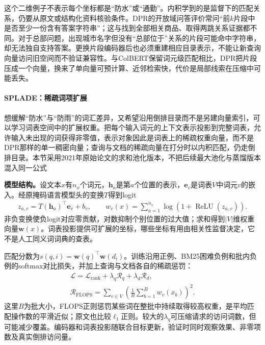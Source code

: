 这个二维例子不表示每个坐标都是“防水”或“通勤”。内积学到的是监督下的匹配关系，仍要从原文或结构化资料核验条件。DPR的开放域问答评价常问“前$k$片段中是否至少一份含有答案字符串”；这与找到全部相关商品、取得两跳关系证据都不同。对于总部问题，出现城市名字但没有“总部位于”关系的片段可能命中字符串，却无法独自支持答案。更换片段编码器后也必须重建相应目录表示，不能让新查询向量访问旧空间而不验证兼容性。与ColBERT保留词元级匹配相比，DPR把片段压成一个向量，换来了单向量可预计算、近邻检索快，代价是局部线索在压缩中可能丢失。

\Needspace{100mm}
\paragraph{SPLADE：稀疏词项扩展}
\label{sec:rs-search-splade}

想缓解“防水”与“防雨”的词汇差异，又希望沿用倒排目录而不是另建向量索引，可以学习词表空间中的扩展权重。把每个输入词元的上下文表示投影到完整词表，允许输入未出现的词获得非零值，表示对象因此是词表上的稀疏权重向量，而不是DPR那样的单一稠密向量；查询与文档的稀疏向量在打分时以内积匹配，仍走倒排目录。本节采用2021年原始论文的求和池化版本，不把后续最大池化与蒸馏版本混入同一公式

\textbf{模型结构。}设文本$x$有$n_x$个词元，$\bm h_a$是第$a$个位置的表示，$\bm e_v$是词表$V$中词元$v$的嵌入。经原掩码语言模型头的变换$T$得到logit
\begin{equation}
 \begin{split}
 z_{a,v}=T(\bm h_a)^\top\bm e_v+b_v,\qquad
 w_v(x)=\sum_{a=1}^{n_x}\log(1+\operatorname{ReLU}(z_{a,v})).
 \end{split}
 \label{eq:rs-search-splade-representation}
\end{equation}
非负变换使负logit对应零贡献，对数抑制个别位置的过大值；求和得到$\lvert V\rvert$维权重向量$\bm w(x)$。词表投影提供可扩展的坐标，哪些坐标有用由相关性监督决定，它不是人工同义词词典的查表。

匹配分数为$s(q,i)=\bm w(q)^\top\bm w(d_i)$。训练沿用正例、BM25困难负例和批内负例的softmax对比损失，并加上查询与文档各自的稀疏惩罚：
\begin{equation}
 \begin{split}
 \mathcal L=\mathcal L_{\mathrm{rank}}+
 \lambda_q\mathcal R_q+\lambda_d\mathcal R_d,\qquad\\
 \mathcal R_{\mathrm{FLOPS}}
 =\sum_{v\in V}\left(\frac1B\sum_{b=1}^{B}w_v(x_b)\right)^2 .
 \end{split}
 \label{eq:rs-search-splade-objective}
\end{equation}
这里$B$为批大小，FLOPS正则惩罚某些词在整批中持续取得较高权重，是平均匹配操作数的平滑近似；原文也比较$\ell_1$正则。较大的$\lambda_q$可压缩请求的访问词数，但可能减少覆盖。编码器和词表投影随联合目标更新，验证时同时观察效果、非零项数及真实倒排访问量。


